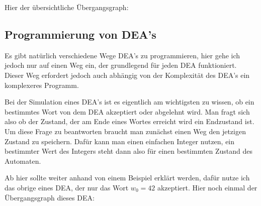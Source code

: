 \begin{flushleft}   
    Hier der übersichtliche Übergangsgraph:
\end{flushleft}

\begin{center}
\end{center}

\subsection{Programmierung von DEA's}
\begin{flushleft}
    Es gibt natürlich verschiedene Wege DEA's zu programmieren, hier gehe ich jedoch nur auf einen Weg ein,
    der grundlegend für jeden DEA funktioniert. Dieser Weg erfordert jedoch auch abhängig von der Komplexität des DEA's
    ein komplexeres Programm.
\end{flushleft}

\begin{flushleft}
    Bei der Simulation eines DEA's ist es eigentlich am wichtigsten zu wissen, ob ein bestimmtes Wort von dem DEA akzeptiert oder
    abgelehnt wird. Man fragt sich also ob der Zustand, der am Ende eines Wortes erreicht wird ein Endzustand ist.
    Um diese Frage zu beantworten braucht man zunächst einen Weg den jetzigen Zustand zu speichern.
    Dafür kann man einen einfachen Integer nutzen, ein bestimmter Wert des Integers steht dann also für einen bestimmten Zustand des Automaten.
\end{flushleft}

\begin{flushleft}
    Ab hier sollte weiter anhand von einem Beispiel erklärt werden, dafür nutze ich das obrige  eines DEA,
    der nur das Wort $w_0=42$ akzeptiert.
    Hier noch einmal der Übergangsgraph dieses DEA:
\end{flushleft}

\begin{center}
\end{center}


